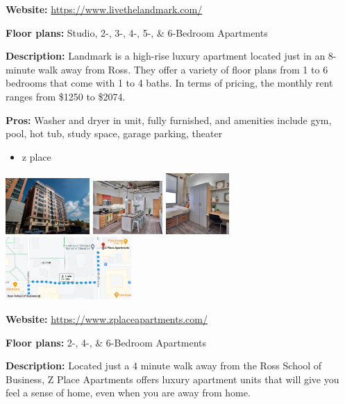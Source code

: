 \documentclass[
]{book}
\providecommand{\tightlist}{%
  \setlength{\itemsep}{0pt}\setlength{\parskip}{0pt}}
\begin{document}
\textbf{Website:} \url{https://www.livethelandmark.com/}

\textbf{Floor plans:} Studio, 2-, 3-, 4-, 5-, \& 6-Bedroom Apartments

\textbf{Description:} Landmark is a high-rise luxury apartment located just in an 8-minute walk away from Ross. They offer a variety of floor plans from 1 to 6 bedrooms that come with 1 to 4 baths. In terms of pricing, the monthly rent ranges from \$1250 to \$2074.

\textbf{Pros:} Washer and dryer in unit, fully furnished, and amenities include gym, pool, hot tub, study space, garage parking, theater

\begin{itemize}
\tightlist
\item
  z place
\end{itemize}

\includegraphics[width=0.24\textwidth,height=\textheight]{zplace_exterior.png}
\includegraphics[width=0.2\textwidth,height=\textheight]{zplace_interior1.png}
\includegraphics[width=0.18\textwidth,height=\textheight]{zplace_interior2.png}
\includegraphics[width=0.36\textwidth,height=\textheight]{zplace_map.png}

\textbf{Website:} \url{https://www.zplaceapartments.com/}

\textbf{Floor plans:} 2-, 4-, \& 6-Bedroom Apartments

\textbf{Description:} Located just a 4 minute walk away from the Ross School of Business, Z Place Apartments offers luxury apartment units that will give you feel a sense of home, even when you are away from home.
\end{document}
